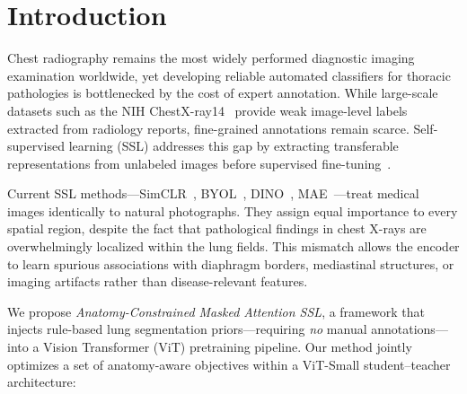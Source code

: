 \section{Introduction}
\label{sec:introduction}

Chest radiography remains the most widely performed diagnostic imaging examination worldwide, yet developing reliable automated classifiers for thoracic pathologies is bottlenecked by the cost of expert annotation. While large-scale datasets such as the NIH ChestX-ray14~\cite{wang2017chestxray} provide weak image-level labels extracted from radiology reports, fine-grained annotations remain scarce. Self-supervised learning (SSL) addresses this gap by extracting transferable representations from unlabeled images before supervised fine-tuning~\cite{chen2020simclr, he2020moco}.

Current SSL methods---SimCLR~\cite{chen2020simclr}, BYOL~\cite{grill2020byol}, DINO~\cite{caron2021dino}, MAE~\cite{he2022mae}---treat medical images identically to natural photographs. They assign equal importance to every spatial region, despite the fact that pathological findings in chest X-rays are overwhelmingly localized within the lung fields. This mismatch allows the encoder to learn spurious associations with diaphragm borders, mediastinal structures, or imaging artifacts rather than disease-relevant features.

We propose \textit{Anatomy-Constrained Masked Attention SSL}, a framework that injects rule-based lung segmentation priors---requiring \emph{no} manual annotations---into a Vision Transformer (ViT) pretraining pipeline. Our method jointly optimizes a set of anatomy-aware objectives within a ViT-Small student--teacher architecture:

